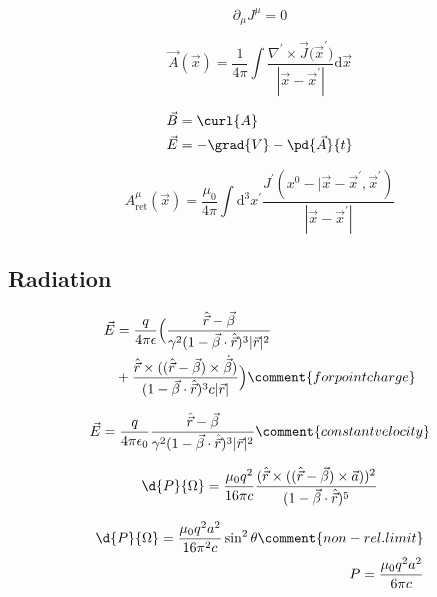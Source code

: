 \begin{equation*}
    \partial_{\mu}J^{\mu} = 0
\end{equation*}

\begin{equation*}
    \vec{A}(\vec{x}) = \frac{1}{4\pi} \int \frac{\nabla^{\prime} \times \vec{J}({\vec{x}^{\prime})}}{|\vec{x} - \vec{x}^{\prime}|} \mathrm{d}\vec{x}
\end{equation*}

\begin{align*}
    \vec{B} &= \curl{A}\\
    \vec{E} &= -\grad{V} - \pd{\vec{A}}{t}
\end{align*}

\begin{equation*}
    A^{\mu}_{\text{ret}}(\vec{x}) = \frac{\mu_0}{4\pi} \int \mathrm{d}^{3}x^{\prime}
    \frac{J^{\prime}(x^{0} - |\vec{x} - \vec{x}^{\prime}, \vec{x}^{\prime})}{|\vec{x} - \vec{x}^{\prime}|}
\end{equation*}

\subsection{Radiation}

\begin{align*}
    \vec{E} &= \frac{q}{4\pi \epsilon}
    \Bigl(\frac{\hat{\vec{r}} - \vec{\beta}}{\gamma^{2} (1 - \vec{\beta}\cdot\hat{\vec{r}})^{3} |\vec{r}|^{2}} \\
        &+\frac{\hat{\vec{r}} \times ((\hat{\vec{r}} - \vec{\beta}) \times \dot{\vec{\beta}})}{(1- \vec{\beta}\cdot\hat{\vec{r}})^{3}c|\vec{r}|}\Bigr) \comment{for point charge}
\end{align*}

\begin{equation*}
    \vec{E} = \frac{q}{4\pi\epsilon_{0}} \frac{\hat{\vec{r}} - \vec{\beta}}{\gamma^{2} (1-\vec{\beta}\cdot\hat{\vec{r}})^{3}|\vec{r}|^{2}} \comment{constant velocity}
\end{equation*}

\begin{equation*}
    \d{P}{\Omega} = \frac{\mu_{0} q^{2}}{16\pi c}
    \frac{(\hat{\vec{r}} \times ((\hat{\vec{r}} - \vec{\beta}) \times \vec{a}))^{2}}
    {(1 - \vec{\beta} \cdot \hat{\vec{r}})^{5}}
\end{equation*}

\begin{align*}
    \d{P}{\Omega} = \frac{\mu_{0} q^{2} a^{2}}{16 \pi^{2}c} \sin^{2}\theta \comment{non-rel. limit} \\
    P = \frac{\mu_{0} q^{2} a^{2}}{6 \pi c}
\end{align*}

